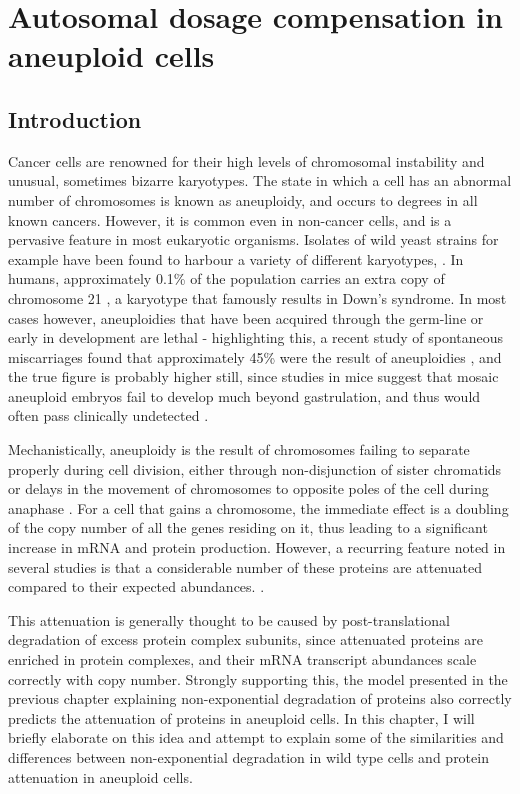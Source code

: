 \documentclass[a4paper,11pt,twoside,openright]{scrbook}
\begin{document}
\chapter{Autosomal dosage compensation in aneuploid cells}\label{chapter:aneuploidy}

\section{Introduction}

Cancer cells are renowned for their high levels of chromosomal instability and unusual, sometimes bizarre karyotypes. The state in which a cell has an abnormal number of chromosomes is known as aneuploidy, and occurs to degrees in all known cancers. However, it is common even in non-cancer cells, and is a pervasive feature in most eukaryotic organisms. Isolates of wild yeast strains for example have been found to harbour a variety of different karyotypes, \cite{Hose2015}. In humans, approximately 0.1\% of the population carries an extra copy of chromosome 21 \cite{Presson2013}, a karyotype that famously results in Down's syndrome. In most cases however, aneuploidies that have been acquired through the germ-line or early in development are lethal - highlighting this, a recent study of spontaneous miscarriages found that approximately 45\% were the result of aneuploidies \cite{Jia2015}, and the true figure is probably higher still, since studies in mice suggest that mosaic aneuploid embryos fail to develop much beyond gastrulation, and thus would often pass clinically undetected \cite{Lightfoot2006}.

Mechanistically, aneuploidy is the result of chromosomes failing to separate properly during cell division, either through non-disjunction of sister chromatids or delays in the movement of chromosomes to opposite poles of the cell during anaphase \cite{Compton2011}. For a cell that gains a chromosome, the immediate effect is a doubling of the copy number of all the genes residing on it, thus leading to a significant increase in mRNA and protein production. However, a recurring feature noted in several studies is that a considerable number of these proteins are attenuated compared to their expected abundances. \cite{Stingele2012,Dephoure2014,Goncalves2017}.

This attenuation is generally thought to be caused by post-translational degradation of excess protein complex subunits, since attenuated proteins are enriched in protein complexes, and their mRNA transcript abundances scale correctly with copy number. Strongly supporting this, the model presented in the previous chapter explaining non-exponential degradation of proteins also correctly predicts the attenuation of proteins in aneuploid cells. In this chapter, I will briefly elaborate on this idea and attempt to explain some of the similarities and differences between non-exponential degradation in wild type cells and protein attenuation in aneuploid cells.
\end{document}

